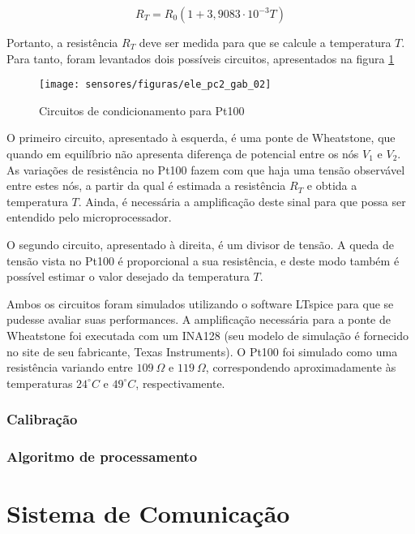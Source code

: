 			\begin{equation}
			R_T = R_0 (1 + 3,9083 \cdot 10^{-3} T)
			\end{equation}

		Portanto, a resistência $R_T$ deve ser medida para que se calcule a temperatura $T$. Para tanto, foram levantados dois possíveis circuitos, apresentados na figura \ref{ele_pc2_gab_02}


			\begin{figure}
				\centering
				\texttt{[image: sensores/figuras/ele\_pc2\_gab\_02]}
				\caption{Circuitos de condicionamento para Pt100}
				\label{ele_pc2_gab_02}
			\end{figure}

		O primeiro circuito, apresentado à esquerda, é uma ponte de Wheatstone, que quando em equilíbrio não apresenta diferença de potencial entre os nós $V_1$ e $V_2$. As variações de resistência no Pt100 fazem com que haja uma tensão observável entre estes nós, a partir da qual é estimada a resistência $R_T$ e obtida a temperatura $T$. Ainda, é necessária a amplificação deste sinal para que possa ser entendido pelo microprocessador.

		O segundo circuito, apresentado à direita, é um divisor de tensão. A queda de tensão vista no Pt100 é proporcional a sua resistência, e deste modo também é possível estimar o valor desejado da temperatura $T$.

		Ambos os circuitos foram simulados utilizando o software LTspice para que se pudesse avaliar suas performances. A amplificação necessária para a ponte de Wheatstone foi executada com um INA128 (seu modelo de simulação é fornecido no site de seu fabricante, Texas Instruments). O Pt100 foi simulado como uma resistência variando entre $109~\Omega$ e $119~\Omega$, correspondendo aproximadamente às temperaturas $24^{\circ}C$ e $49^{\circ}C$, respectivamente.

		\subsubsection{Calibração}

		\subsubsection{Algoritmo de processamento}


\section{Sistema de Comunicação}
		
